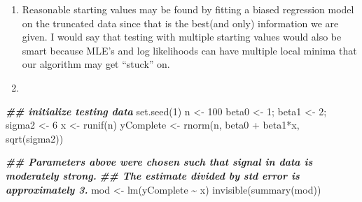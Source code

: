 \documentclass[
]{article}
\newenvironment{Shaded}{\begin{snugshade}}{\end{snugshade}}
\newcommand{\DecValTok}[1]{\textcolor[rgb]{0.00,0.00,0.81}{#1}}
\newcommand{\DocumentationTok}[1]{\textcolor[rgb]{0.56,0.35,0.01}{\textbf{\textit{#1}}}}
\newcommand{\FunctionTok}[1]{\textcolor[rgb]{0.00,0.00,0.00}{#1}}
\newcommand{\NormalTok}[1]{#1}
\newcommand{\OtherTok}[1]{\textcolor[rgb]{0.56,0.35,0.01}{#1}}
\newcommand{\SpecialCharTok}[1]{\textcolor[rgb]{0.00,0.00,0.00}{#1}}
\begin{document}
\begin{enumerate}
\def\labelenumi{\alph{enumi}.}
\setcounter{enumi}{1}
\item
  Reasonable starting values may be found by fitting a biased regression
  model on the truncated data since that is the best(and only)
  information we are given. I would say that testing with multiple
  starting values would also be smart because MLE's and log likelihoods
  can have multiple local minima that our algorithm may get ``stuck''
  on.
\item
\end{enumerate}

\begin{Shaded}
\begin{Highlighting}[]
\DocumentationTok{\#\# initialize testing data }
\FunctionTok{set.seed}\NormalTok{(}\DecValTok{1}\NormalTok{)}
\NormalTok{n }\OtherTok{\textless{}{-}} \DecValTok{100}
\NormalTok{beta0 }\OtherTok{\textless{}{-}} \DecValTok{1}\NormalTok{; beta1 }\OtherTok{\textless{}{-}} \DecValTok{2}\NormalTok{; sigma2 }\OtherTok{\textless{}{-}} \DecValTok{6}
\NormalTok{x }\OtherTok{\textless{}{-}} \FunctionTok{runif}\NormalTok{(n)}
\NormalTok{yComplete }\OtherTok{\textless{}{-}} \FunctionTok{rnorm}\NormalTok{(n, beta0 }\SpecialCharTok{+}\NormalTok{ beta1}\SpecialCharTok{*}\NormalTok{x, }\FunctionTok{sqrt}\NormalTok{(sigma2))}

\DocumentationTok{\#\# Parameters above were chosen such that signal in data is moderately strong.}
\DocumentationTok{\#\# The estimate divided by std error is approximately 3.}
\NormalTok{mod }\OtherTok{\textless{}{-}} \FunctionTok{lm}\NormalTok{(yComplete }\SpecialCharTok{\textasciitilde{}}\NormalTok{ x)}
\FunctionTok{invisible}\NormalTok{(}\FunctionTok{summary}\NormalTok{(mod))}
\end{Highlighting}
\end{Shaded}
\end{document}
